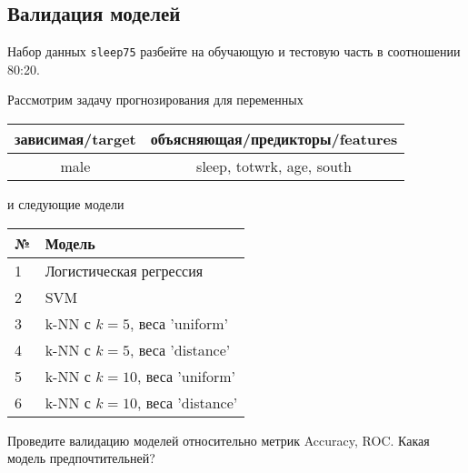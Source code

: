 \subsection{Валидация моделей}

\begin{exercise}
Набор данных \texttt{sleep75} разбейте на обучающую и тестовую часть
в соотношении 80:20.

Рассмотрим задачу прогнозирования для переменных
\begin{center}
	\begin{tabular}{|c|c|}\hline
		зависимая/target & объясняющая/предикторы/features \\ \hline
		male & sleep, totwrk, age, south \\ \hline
	\end{tabular}
\end{center}
и следующие модели
\begin{center}
	\begin{tabular}{|l|l|}\hline
		№ & Модель \\ \hline
		1 & Логистическая регрессия\\
		2 & SVM \\ 
		3 & k-NN с \(k=5\), веса 'uniform' \\
		4 & k-NN с \(k=5\), веса 'distance' \\
		5 & k-NN с \(k=10\), веса 'uniform' \\
		6 & k-NN с \(k=10\), веса 'distance' \\ \hline
	\end{tabular}
\end{center}
Проведите валидацию моделей относительно метрик Accuracy, ROC. 
Какая модель предпочтительней?
\end{exercise}

